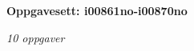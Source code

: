 \centerline{\bf Oppgavesett: i00861no-i00870no}
\vskip 10pt
\centerline{\it 10 oppgaver}\vskip 10pt
\vskip 10pt
